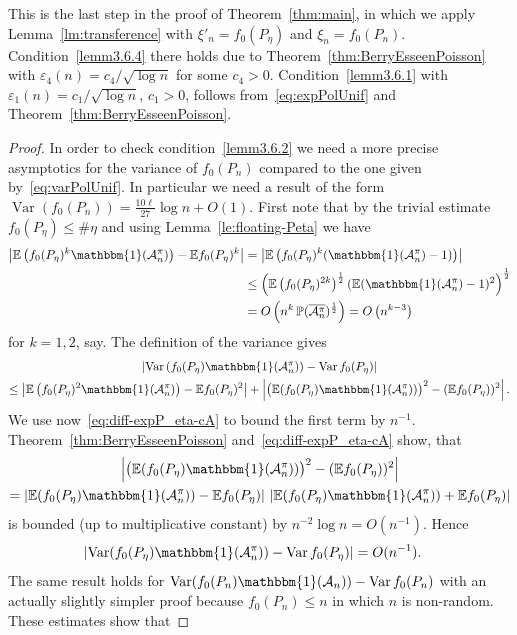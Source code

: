 \documentclass[10pt]{amsart}
\theoremstyle{definition}\newtheorem{defi}[theo]{Definition}\newtheorem{rema}[theo]{Remark}\newtheorem{exam}[theo]{Example}\newtheorem{exem}[theo]{Example}\newtheorem{nota}[theo]{Notation}
\newcommand{\ind}{\mathbbm{1}}
\newcommand{\var}{\operatorname{Var}}
\newcommand{\bbE}{\mathbb{E}}
\newcommand{\bbP}{\mathbb{P}}
\newcommand{\clA}{\mathcal{A}}
\begin{document}
This is the last step in the proof of Theorem~\ref{thm:main}, in which we apply Lemma~\ref{lm:transference} with $\xi'_n=f_0(P_{\eta})$ and $\xi_n=f_0(P_n)$. Condition~\eqref{lemm3.6.4} there holds due to Theorem~\ref{thm:BerryEsseenPoisson} with $\varepsilon_4(n)=c_4/\sqrt{\log n}$ for some $c_4>0$. Condition~\eqref{lemm3.6.1} with $\varepsilon_1(n)=c_1/\sqrt{\log n}$, $c_1>0$, follows from~\eqref{eq:expPolUnif} and Theorem~\ref{thm:BerryEsseenPoisson}.

\begin{proof}
In order to check condition~\eqref{lemm3.6.2} we need a more precise asymptotics for the variance of $f_0(P_n)$ compared to the one given by~\eqref{eq:varPolUnif}. In particular we need a result of the form $\var(f_0(P_{n}))=\frac{10 \ell}{27} \log n +O(1)$. First note that by the trivial estimate $f_0(P_\eta) \leq \# \eta$ and using Lemma~\ref{le:floating-Peta} we have
\begin{equation}\label{eq:diff-expP_eta-cA}
\begin{split}
\left| \bbE \left(f_0(P_\eta)^k \ind(\clA^\pi_n)\right) - \bbE f_0(P_\eta)^k \right| &= \left| \bbE \left(f_0(P_\eta)^k (\ind (\clA^\pi_n) -1)\right) \right|\\ 
&\leq \left(\bbE \left(f_0(P_\eta)^{2k}\right)^{\frac 12} (\bbE (\ind (\clA^\pi_n) -1)^2\right)^{\frac 12}
\\ & = O\left(n^k \, \bbP(\overline{\clA^\pi_n})^{\frac 12}\right) = O\left(n^{k-3}\right)
\end{split}
\end{equation}
for $k=1,2$, say. The definition of the variance gives
\begin{multline*}
\left| \var \left(f_0(P_\eta)  \ind (\clA^\pi_n)\right) - \var f_0(P_\eta) \right|
\\  \leq \left| \bbE \left(f_0(P_\eta)^2 \ind(\clA^\pi_n)\right) - \bbE f_0(P_\eta)^2 \right| + \left|\big(\bbE (f_0(P_\eta) \ind(\clA^\pi_n))\big)^2 - (\bbE f_0(P_\eta))^2 \right|.
\end{multline*}
We use now~\eqref{eq:diff-expP_eta-cA} to bound the first term by $n^{-1}$. Theorem~\ref{thm:BerryEsseenPoisson} and~\eqref{eq:diff-expP_eta-cA} show, that
\begin{multline*}
\left| \big(\bbE (f_0(P_\eta) \ind(\clA^\pi_n))\big)^2  - (\bbE f_0(P_\eta))^2 \right|\\
 = \left| \bbE (f_0(P_\eta) \ind(\clA^\pi_n)) - \bbE f_0(P_\eta) \right|\, \left| \bbE (f_0(P_\eta) \ind(\clA^\pi_n)) + \bbE f_0(P_\eta) \right|
\end{multline*}
is bounded (up to multiplicative constant) by $n^{-2} \log n = O(n^{-1})$. Hence
\begin{align*}
\left| \var (f_0(P_\eta) \ind(\clA^\pi_n)) - \var f_0(P_\eta) \right| & = O(n^{-1}).
\end{align*}
The same result holds for $ \var (f_0(P_n) \ind(\clA_n)) - \var f_0(P_n) $ with an actually slightly simpler proof because $f_0(P_n) \leq n$ in which $n$ is non-random. These estimates show that


\end{proof}
\end{document}
